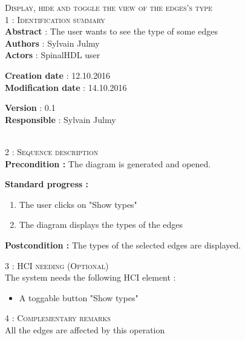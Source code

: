 \begin{flushleft}
    \textsc{\huge Display, hide and toggle the view of the edges's type}\\[0.5cm]

    \BlackLine
    \textsc{\Large 1 : Identification summary}\\[0.3cm]

        \textbf{\large Abstract} : The user wants to see the type of some edges\\[0.1cm]

        \textbf{\large Authors} : Sylvain Julmy \\[0.3cm]			

        \textbf{\large Actors} : SpinalHDL user \\[0.1cm]	
    \begin{minipage}{0.40\textwidth}
        \begin{flushleft}	
            \textbf{\large Creation date} : 12.10.2016 \\[0.1cm]

            \textbf{\large Modification date} : 14.10.2016 \\[0.1cm]
        \end{flushleft}
    \end{minipage}
    \begin{minipage}{0.40\textwidth}
        \begin{flushleft}
            \textbf{\large Version} : 0.1 \\[0.1cm]

            \textbf{\large Responsible} : Sylvain Julmy \\[0.1cm]
        \end{flushleft}
    \end{minipage}
    \\[0.5cm]
    \BlackLine
    \textsc{\Large 2 : Sequence description}\\[0.3cm]

    \textbf{\large Precondition :} The diagram is generated and opened.

    \textbf{\large  Standard progress :}
    \begin{enumerate}[nosep]
        \item The user clicks on "Show types"
        \item The diagram displays the types of the edges
    \end{enumerate}

    \textbf{\large Postcondition :} The types of the selected edges are displayed.

    \BlackLine
    \textsc{\Large 3 : HCI needing (Optional)}\\[0.3cm]
    The system needs the following HCI element :
    \begin{itemize}
        \item A toggable button "Show types"
    \end{itemize}

    \BlackLine
    \textsc{\Large 4 : Complementary remarks}\\[0.3cm]

    All the edges are affected by this operation

\end{flushleft}
